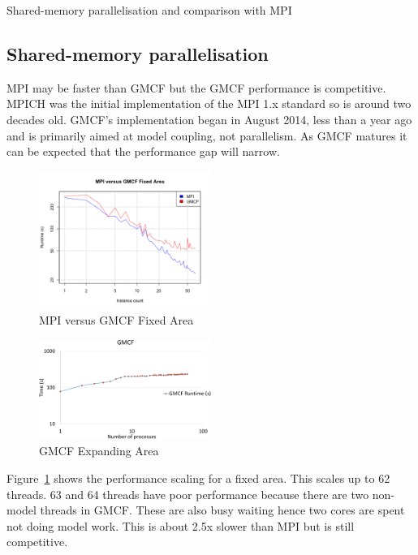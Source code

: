 Shared-memory parallelisation and comparison with MPI

\subsection{Shared-memory parallelisation}

MPI may be faster than GMCF but the GMCF performance is competitive. MPICH was
the initial implementation of the MPI 1.x standard so is around two decades old.
GMCF's implementation began in August 2014, less than a year ago and is
primarily aimed at model coupling, not parallelism. As GMCF matures it can be
expected that the performance gap will narrow.

\begin{figure}
    \includegraphics[width=0.5\textwidth]{graphs/GMCF-MPI-fixed-area}
    \caption{MPI versus GMCF Fixed Area}
    \label{fig:gmcfmpifixedarea}
\end{figure}

\begin{figure}
    \includegraphics[page=1,width=0.5\textwidth]    {graphs/gmcfThreadPinningFasterSorNoREQDATAnewAPISpinBusyWaitExpandingArea-crop.pdf}
    \caption{GMCF Expanding Area}
    \label{fig:gmcfexpandingarea}
\end{figure}

Figure~\ref{fig:gmcfmpifixedarea} shows the performance scaling for a fixed
area. This scales up to 62 threads. 63 and 64 threads have poor performance
because there are two non-model threads in GMCF. These are also busy waiting
hence two cores are spent not doing model work. This is about 2.5x slower than
MPI but is still competitive.

